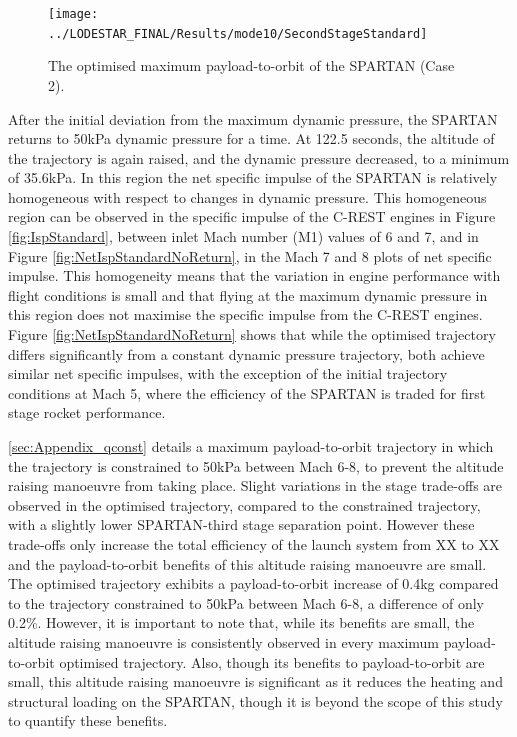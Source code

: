\begin{figure}[ht!]
\centering
\texttt{[image: ../LODESTAR\_FINAL/Results/mode10/SecondStageStandard]}
\caption{The optimised maximum payload-to-orbit of the SPARTAN (Case 2).}
\label{fig:SecondStageStandardNoReturn}
\end{figure}



After the initial deviation from the maximum dynamic pressure, the SPARTAN returns to 50kPa dynamic pressure for a time. 
At 122.5 seconds, the altitude of the trajectory is again raised, and the dynamic pressure decreased, to a minimum of 35.6kPa. In this region the net specific impulse of the SPARTAN is relatively homogeneous with respect to changes in dynamic pressure. This homogeneous region can be observed in the specific impulse of the C-REST engines in Figure \ref{fig:IspStandard}, between inlet Mach number (M1) values of 6 and 7, and in Figure \ref{fig:NetIspStandardNoReturn}, in the Mach 7 and 8 plots of net specific impulse. This homogeneity means that the variation in engine performance with flight conditions is small and that flying at the maximum dynamic pressure in this region does not maximise the specific impulse from the C-REST engines. Figure \ref{fig:NetIspStandardNoReturn} shows that while the optimised trajectory differs significantly from a constant dynamic pressure trajectory, both achieve similar net specific impulses, with the exception of the initial trajectory conditions at Mach 5, where the efficiency of the SPARTAN is traded for first stage rocket performance. 


\ref{sec:Appendix_qconst} details a maximum payload-to-orbit trajectory in which the trajectory is constrained to 50kPa between Mach 6-8, to prevent the altitude raising manoeuvre from taking place. 
Slight variations in the stage trade-offs are observed in the optimised trajectory, compared to the constrained trajectory, with a slightly lower SPARTAN-third stage separation point. However these trade-offs
only increase the total efficiency of the launch system from XX to XX and the payload-to-orbit benefits of this altitude raising manoeuvre are small. 
The optimised trajectory exhibits a payload-to-orbit increase of 0.4kg compared to the trajectory constrained to 50kPa between Mach 6-8, a difference of only 0.2\%.
However, it is important to note that, while its benefits are small, the altitude raising manoeuvre is consistently observed in every maximum payload-to-orbit optimised trajectory. 
Also, though its benefits to payload-to-orbit are small, this altitude raising manoeuvre is significant as it reduces the heating and structural loading on the SPARTAN, though it is beyond the scope of this study to quantify these benefits. 




